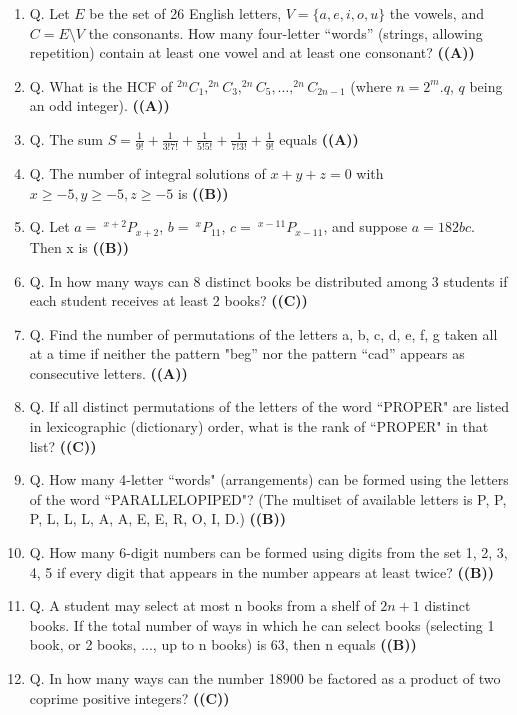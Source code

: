 \documentclass{article}
\begin{document}
\begin{enumerate}
\item Q. Let $E$ be the set of 26 English letters, $V = \{a, e, i, o, u\}$ the vowels, and $C = E \setminus V$ the consonants. How many four-letter “words” (strings, allowing repetition) contain at least one vowel and at least one consonant? \hfill \textbf{((A))}
\item Q. What is the HCF of $^{2n}C_1, ^{2n}C_3, ^{2n}C_5, \dots, ^{2n}C_{2n-1}$ (where $n = 2^m.q$, $q$ being an odd integer). \hfill \textbf{((A))}
\item Q. The sum $S = \frac{1}{9!} + \frac{1}{3!7!} + \frac{1}{5!5!} + \frac{1}{7!3!} + \frac{1}{9!}$ equals \hfill \textbf{((A))}
\item Q. The number of integral solutions of $x + y + z = 0$ with $x \ge -5, y \ge -5, z \ge -5$ is \hfill \textbf{((B))}
\item Q. Let $a = \ ^{x+2}P_{x+2}$, $b = \ ^{x}P_{11}$, $c = \ ^{x-11}P_{x-11}$, and suppose $a = 182 bc$. Then x is \hfill \textbf{((B))}
\item Q. In how many ways can 8 distinct books be distributed among 3 students if each student receives at least 2 books? \hfill \textbf{((C))}
\item Q. Find the number of permutations of the letters a, b, c, d, e, f, g taken all at a time if neither the pattern "beg” nor the pattern “cad” appears as consecutive letters. \hfill \textbf{((A))}
\item Q. If all distinct permutations of the letters of the word “PROPER" are listed in lexicographic (dictionary) order, what is the rank of “PROPER" in that list? \hfill \textbf{((C))}
\item Q. How many 4-letter “words" (arrangements) can be formed using the letters of the word “PARALLELOPIPED"? (The multiset of available letters is {P, P, P, L, L, L, A, A, E, E, R, O, I, D}.) \hfill \textbf{((B))}
\item Q. How many 6-digit numbers can be formed using digits from the set {1, 2, 3, 4, 5} if every digit that appears in the number appears at least twice? \hfill \textbf{((B))}
\item Q. A student may select at most n books from a shelf of $2n + 1$ distinct books. If the total number of ways in which he can select books (selecting 1 book, or 2 books, ..., up to n books) is 63, then n equals \hfill \textbf{((B))}
\item Q. In how many ways can the number 18900 be factored as a product of two coprime positive integers? \hfill \textbf{((C))}

\end{enumerate}
\end{document}
